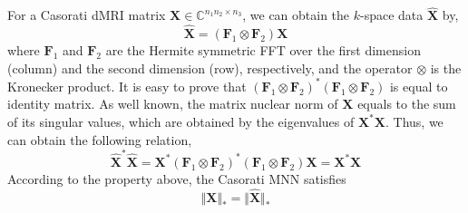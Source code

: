 \documentclass{article}
\begin{document}
For a Casorati dMRI matrix $\mathbf{X} \in \mathbb{C}^{n_1  n_2 \times n_3}$, we can obtain the $k$-space data $\hat{\mathbf X}$ by,
\begin{equation}
  \hat{\mathbf{X}} = (\mathbf F_1 \otimes \mathbf F_2) \mathbf X
\end{equation}
where $\mathbf F_1$ and $\mathbf F_2$ are the Hermite symmetric FFT over the first dimension (column) and the second dimension (row), respectively, and the operator $\otimes$ is the Kronecker product. It is easy to prove that $(\mathbf F_1 \otimes \mathbf F_2)^*(\mathbf F_1 \otimes \mathbf F_2)$ is equal to identity matrix. 
As well known, the matrix nuclear norm of $\mathbf X$ equals to the sum of its singular values, which are obtained by the eigenvalues of $\mathbf X^* \mathbf X$. Thus, we can obtain the following relation, 
\begin{equation}
  \label{proof_mnn}
\hat{\mathbf{X}}^*\hat{\mathbf{X}} = \mathbf X^*(\mathbf F_1 \otimes \mathbf F_2)^*(\mathbf F_1 \otimes \mathbf F_2) \mathbf X = \mathbf X^* \mathbf X
\end{equation}
According to the property above, the Casorati MNN satisfies
\begin{equation}
  \label{mnn_p}
\Vert  \mathbf{X} \Vert_* = \Vert  \hat{\mathbf{X}} \Vert_*
\end{equation}
\end{document}
